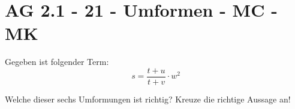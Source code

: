 \section{AG 2.1 - 21 - Umformen - MC - MK}

\begin{beispiel}[AG 2.1]{1}
Gegeben ist folgender Term:
				$$s=\frac{t+u}{t+v}\cdot w^2$$
				
				Welche dieser sechs Umformungen ist richtig? Kreuze die richtige Aussage an!
\end{beispiel}